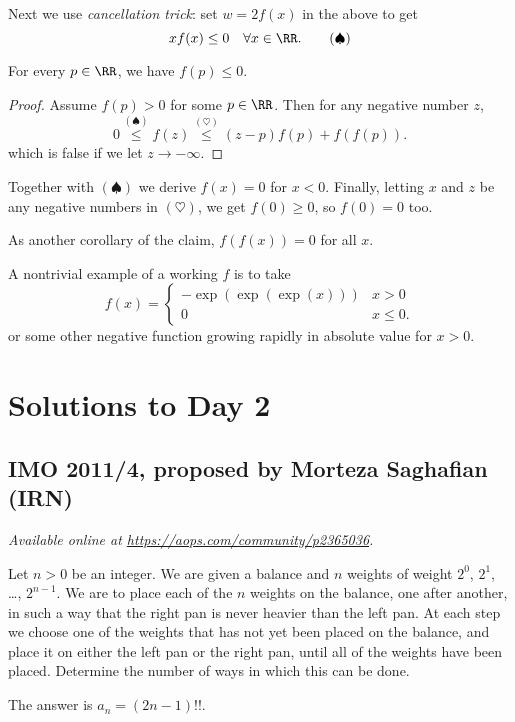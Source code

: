 \documentclass[11pt]{scrartcl}
\begin{document}

Next we use \emph{cancellation trick}:
set $w = 2f(x)$ in the above to get
\[ xf(x) \le 0 \quad \forall x \in \RR. \qquad (\spadesuit) \]

\begin{claim*}
  For every $p \in \RR$, we have $f(p) \le 0$.
\end{claim*}
\begin{proof}
  Assume $f(p) > 0$ for some $p \in \RR$.
  Then for any negative number $z$,
  \[ 0 \overset{(\spadesuit)}{\le} f(z)
    \overset{(\heartsuit)}{\le} (z-p)f(p) + f(f(p)). \]
  which is false if we let $z \to -\infty$.
\end{proof}

Together with $(\spadesuit)$ we derive $f(x) = 0$ for $x < 0$.
Finally, letting $x$ and $z$ be any negative numbers
in $(\heartsuit)$, we get $f(0) \ge 0$, so $f(0) = 0$ too.
\begin{remark*}
  As another corollary of the claim, $f(f(x)) = 0$ for all $x$.
\end{remark*}
\begin{remark*}
  A nontrivial example of a working $f$
  is to take
  \[ f(x) = \begin{cases}
      -\exp(\exp(\exp(x))) & x > 0 \\
      0 & x \le 0.
    \end{cases} \]
  or some other negative function growing rapidly in absolute value
  for $x > 0$.
\end{remark*}
\pagebreak

\section{Solutions to Day 2}
\subsection{IMO 2011/4, proposed by Morteza Saghafian (IRN)}
\textsl{Available online at \url{https://aops.com/community/p2365036}.}
\begin{mdframed}[style=mdpurplebox,frametitle={Problem statement}]
Let $n > 0$ be an integer.
We are given a balance and $n$ weights of weight $2^0$, $2^1$, \dots, $2^{n-1}$.
We are to place each of the $n$ weights on the balance, one after another,
in such a way that the right pan is never heavier than the left pan.
At each step we choose one of the weights
that has not yet been placed on the balance,
and place it on either the left pan or the right pan,
until all of the weights have been placed.
Determine the number of ways in which this can be done.
\end{mdframed}
The answer is $a_n = (2n-1)!!$.
\end{document}
